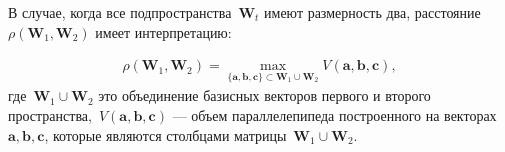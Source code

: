 В случае, когда все подпространства~$\textbf{W}_t$ имеют размерность два, расстояние~$\rho\left(\textbf{W}_1, \textbf{W}_2\right)$ имеет интерпретацию:

\[
\label{eq:cl:5}
\begin{aligned}
\rho\left(\textbf{W}_1, \textbf{W}_2\right) = \max_{\{\textbf{a},\textbf{b},\textbf{c}\} \subset \textbf{W}_1\cup \textbf{W}_2 } V\left(\textbf{a},\textbf{b},\textbf{c}\right), 
\end{aligned}
\]
где~$\textbf{W}_1\cup\textbf{W}_2$ это объединение базисных векторов первого и второго пространства,~$V\left(\textbf{a},\textbf{b},\textbf{c}\right)$ --- объем параллелепипеда построенного на векторах~$\textbf{a}, \textbf{b}, \textbf{c}$, которые являются столбцами матрицы~$\textbf{W}_1\cup\textbf{W}_2$.


